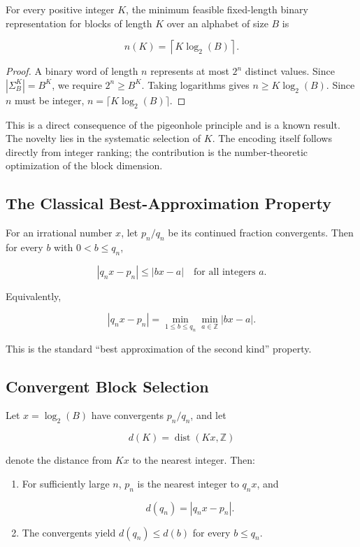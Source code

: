 \documentclass[10pt, conference]{IEEEtran}
\begin{document}
\begin{proposition}
For every positive integer $K$, the minimum feasible fixed-length binary representation for blocks of length $K$ over an alphabet of size $B$ is

\[
n(K) = \left\lceil K\log_2(B)\right\rceil.
\]
\end{proposition}

\begin{proof}
A binary word of length $n$ represents at most $2^n$ distinct values. Since $|\Sigma_B^K|=B^K$, we require $2^n \ge B^K$. Taking logarithms gives $n \ge K\log_2(B)$. Since $n$ must be integer, $n=\lceil K\log_2(B)\rceil$.
\end{proof}

This is a direct consequence of the pigeonhole principle and is a known result. The novelty lies in the systematic selection of $K$. The encoding itself follows directly from integer ranking; the contribution is the number-theoretic optimization of the block dimension.

\subsection{The Classical Best-Approximation Property}

\begin{theorem}
For an irrational number $x$, let $p_n/q_n$ be its continued fraction convergents. Then for every $b$ with $0 < b \le q_n$,

\[
|q_n x - p_n| \le |b x - a| \quad \text{for all integers } a.
\]

Equivalently,

\[
|q_n x - p_n| = \min_{1 \le b \le q_n} \min_{a \in \mathbb{Z}} |b x - a|.
\]
\end{theorem}

This is the standard ``best approximation of the second kind'' property.

\subsection{Convergent Block Selection}

\begin{proposition}
Let $x = \log_2(B)$ have convergents $p_n/q_n$, and let

\[
d(K) = \operatorname{dist}(Kx, \mathbb{Z})
\]

denote the distance from $Kx$ to the nearest integer. Then:

\begin{enumerate}
\item For sufficiently large $n$, $p_n$ is the nearest integer to $q_n x$, and

\[
d(q_n) = |q_n x - p_n|.
\]

\item The convergents yield $d(q_n) \le d(b)$ for every $b \le q_n$.
\end{enumerate}
\end{proposition}
\end{document}
